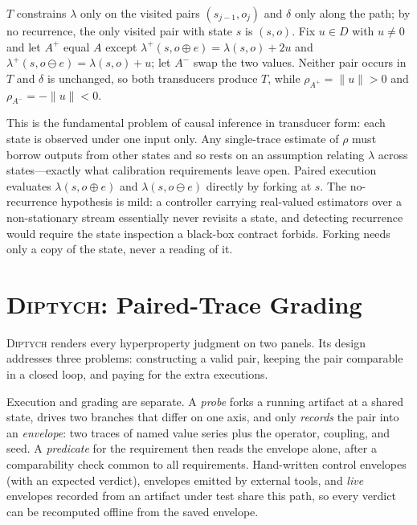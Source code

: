 \documentclass[conference]{IEEEtran}
\newcommand{\sys}{\textsc{Diptych}}
\begin{document}
	\begin{IEEEproof}
		$T$ constrains $\lambda$ only on the visited pairs $(s_{j-1}, o_j)$ and
		$\delta$ only along the path; by no recurrence, the only visited pair
		with state $s$ is $(s, o)$. Fix $u \in D$ with $u \neq 0$ and let $A^{+}$
		equal $A$ except $\lambda^{+}(s, o \oplus e) = \lambda(s,o) + 2u$ and
		$\lambda^{+}(s, o \ominus e) = \lambda(s,o) + u$; let $A^{-}$ swap the two
		values. Neither pair occurs in $T$ and $\delta$ is unchanged, so both
		transducers produce $T$, while $\rho_{A^{+}} = \|u\| > 0$ and
		$\rho_{A^{-}} = -\|u\| < 0$.
	\end{IEEEproof}
	
	This is the fundamental problem of causal inference \cite{holland1986}
	in transducer form: each state is observed under one input only. Any
	single-trace estimate of $\rho$ must borrow outputs from other states and
	so rests on an assumption relating $\lambda$ across states---exactly
	what calibration requirements leave open. Paired execution evaluates
	$\lambda(s, o \oplus e)$ and $\lambda(s, o \ominus e)$ directly by forking
	at $s$. The no-recurrence hypothesis is mild: a controller carrying
	real-valued estimators over a non-stationary stream essentially never
	revisits a state, and detecting recurrence would require the state
	inspection a black-box contract forbids. Forking needs only a copy of the
	state, never a reading of it.
	
	\section{\sys{}: Paired-Trace Grading}
	\label{sec:harness}
	
	\sys{} renders every hyperproperty judgment on two panels. Its design
	addresses three problems: constructing a valid pair, keeping the pair
	comparable in a closed loop, and paying for the extra executions.
	
	Execution and grading are separate. A \emph{probe} forks a running
	artifact at a shared state, drives two branches that differ on one axis,
	and only \emph{records} the pair into an \emph{envelope}: two traces of
	named value series plus the operator, coupling, and seed. A
	\emph{predicate} for the requirement then reads the envelope alone, after
	a comparability check common to all requirements. Hand-written control
	envelopes (with an expected verdict), envelopes emitted by external
	tools, and \emph{live} envelopes recorded from an artifact under test
	share this path, so every verdict can be recomputed offline from the
	saved envelope.
	
\end{document}
